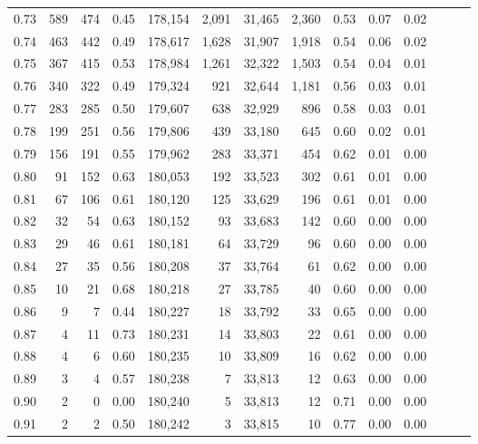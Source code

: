 \begin{tabular}{rrrrrrrrrrrrrr}
0.73 &    589 &    474 &  0.45 &  178,154 &    2,091 &  31,465 &   2,360 &  0.53 &  0.07 &      0.02 \\
0.74 &    463 &    442 &  0.49 &  178,617 &    1,628 &  31,907 &   1,918 &  0.54 &  0.06 &      0.02 \\
0.75 &    367 &    415 &  0.53 &  178,984 &    1,261 &  32,322 &   1,503 &  0.54 &  0.04 &      0.01 \\
0.76 &    340 &    322 &  0.49 &  179,324 &      921 &  32,644 &   1,181 &  0.56 &  0.03 &      0.01 \\
0.77 &    283 &    285 &  0.50 &  179,607 &      638 &  32,929 &     896 &  0.58 &  0.03 &      0.01 \\
0.78 &    199 &    251 &  0.56 &  179,806 &      439 &  33,180 &     645 &  0.60 &  0.02 &      0.01 \\
0.79 &    156 &    191 &  0.55 &  179,962 &      283 &  33,371 &     454 &  0.62 &  0.01 &      0.00 \\
0.80 &     91 &    152 &  0.63 &  180,053 &      192 &  33,523 &     302 &  0.61 &  0.01 &      0.00 \\
0.81 &     67 &    106 &  0.61 &  180,120 &      125 &  33,629 &     196 &  0.61 &  0.01 &      0.00 \\
0.82 &     32 &     54 &  0.63 &  180,152 &       93 &  33,683 &     142 &  0.60 &  0.00 &      0.00 \\
0.83 &     29 &     46 &  0.61 &  180,181 &       64 &  33,729 &      96 &  0.60 &  0.00 &      0.00 \\
0.84 &     27 &     35 &  0.56 &  180,208 &       37 &  33,764 &      61 &  0.62 &  0.00 &      0.00 \\
0.85 &     10 &     21 &  0.68 &  180,218 &       27 &  33,785 &      40 &  0.60 &  0.00 &      0.00 \\
0.86 &      9 &      7 &  0.44 &  180,227 &       18 &  33,792 &      33 &  0.65 &  0.00 &      0.00 \\
0.87 &      4 &     11 &  0.73 &  180,231 &       14 &  33,803 &      22 &  0.61 &  0.00 &      0.00 \\
0.88 &      4 &      6 &  0.60 &  180,235 &       10 &  33,809 &      16 &  0.62 &  0.00 &      0.00 \\
0.89 &      3 &      4 &  0.57 &  180,238 &        7 &  33,813 &      12 &  0.63 &  0.00 &      0.00 \\
0.90 &      2 &      0 &  0.00 &  180,240 &        5 &  33,813 &      12 &  0.71 &  0.00 &      0.00 \\
0.91 &      2 &      2 &  0.50 &  180,242 &        3 &  33,815 &      10 &  0.77 &  0.00 &      0.00 \\

\end{tabular}
